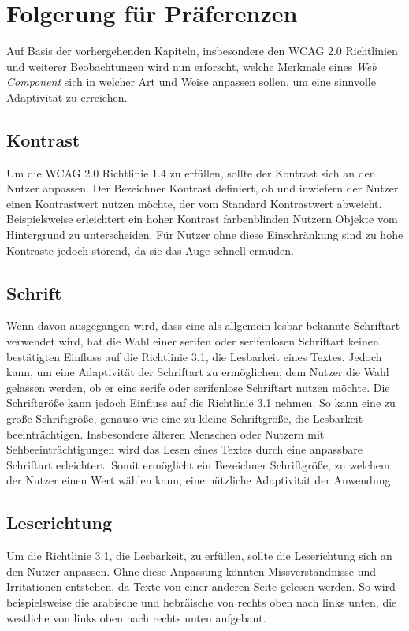 \documentclass[12pt, paper=a4, bibtotoc, toc=listof, headsepline=true, numbers=endperiod]{scrreprt}
\begin{document}
\section{Folgerung für Präferenzen}
\label{sec:folFuePra}
Auf Basis der vorhergehenden Kapiteln, insbesondere den \ac{WCAG 2.0} Richtlinien und weiterer Beobachtungen wird nun erforscht, welche Merkmale eines \emph{Web Component} sich in welcher Art und Weise anpassen sollen, um eine sinnvolle Adaptivität zu erreichen.
\subsection{Kontrast}
Um die \ac{WCAG 2.0} Richtlinie 1.4 zu erfüllen, sollte der Kontrast sich an den Nutzer anpassen. Der Bezeichner Kontrast definiert, ob und inwiefern der Nutzer einen Kontrastwert nutzen möchte, der vom Standard Kontrastwert abweicht. Beispielsweise erleichtert ein hoher Kontrast farbenblinden Nutzern Objekte vom Hintergrund zu unterscheiden. Für Nutzer ohne diese Einschränkung sind zu hohe Kontraste jedoch störend, da sie das Auge schnell ermüden\cite[S.234]{balzert2009webdesign}.
\subsection{Schrift}
Wenn davon ausgegangen wird, dass eine als allgemein lesbar bekannte Schriftart verwendet wird, hat die Wahl einer serifen oder serifenlosen Schriftart keinen bestätigten Einfluss auf die Richtlinie 3.1, die Lesbarkeit eines Textes\cite[S.157-161]{barrierefreiheit}. Jedoch kann, um eine Adaptivität der Schriftart zu ermöglichen, dem Nutzer die Wahl gelassen werden, ob er eine serife oder serifenlose Schriftart nutzen möchte.
Die Schriftgröße kann jedoch Einfluss auf die Richtlinie 3.1 nehmen. So kann eine zu große Schriftgröße, genauso wie eine zu kleine Schriftgröße, die Lesbarkeit beeinträchtigen. Insbesondere älteren Menschen oder Nutzern mit Sehbeeinträchtigungen wird das Lesen eines Textes durch eine anpassbare Schriftart erleichtert\cite[S.152]{barrierefreiheit}. Somit ermöglicht ein Bezeichner Schriftgröße, zu welchem der Nutzer einen Wert wählen kann, eine nützliche Adaptivität der Anwendung. 
\subsection{Leserichtung}
\label{ref:lesRic}
Um die Richtlinie 3.1, die Lesbarkeit, zu erfüllen, sollte die Leserichtung sich an den Nutzer anpassen. Ohne diese Anpassung könnten Missverständnisse und Irritationen entstehen, da Texte von einer anderen Seite gelesen werden. So wird beispielsweise die arabische und hebräische von rechts oben nach links unten, die westliche von links oben nach rechts unten aufgebaut\cite[S.148]{emrich2013interkulturelles}.
\end{document}
